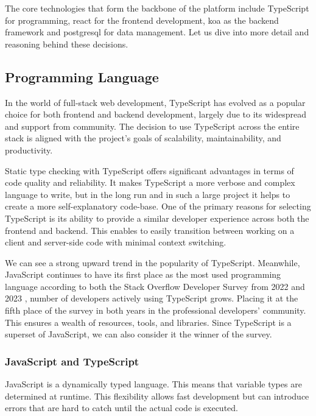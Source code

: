 The core technologies that form the backbone of the platform include TypeScript for programming, \gls{react} for the frontend development, \gls{koa} as the backend framework and \gls{postgresql} for data management.
Let us dive into more detail and reasoning behind these decisions.

\subsection{Programming Language}
\label{subsec:programming-language}
In the world of full-stack web development, TypeScript has evolved as a popular choice for both frontend and backend development, largely due to its widespread and support from community.
The decision to use TypeScript across the entire stack is aligned with the project's goals of scalability, maintainability, and productivity.

Static type checking with TypeScript offers significant advantages in terms of code quality and reliability.
It makes TypeScript a more verbose and complex language to write, but in the long run and in such a large project it helps to create a more self-explanatory code-base.
One of the primary reasons for selecting TypeScript is its ability to provide a similar developer experience across both the frontend and backend.
This enables to easily transition between working on a client and server-side code with minimal context switching.

We can see a strong upward trend in the popularity of TypeScript. Meanwhile, JavaScript continues to have its first place as the most used programming language according to both the Stack Overflow Developer Survey from 2022 \cite{StackOverflow2022} and 2023 \cite{StackOverflow2023}, number of developers actively using TypeScript grows. Placing it at the fifth place of the survey in both years in the professional developers' community.
This ensures a wealth of resources, tools, and libraries.
Since TypeScript is a superset of JavaScript, we can also consider it the winner of the survey.

\subsubsection{JavaScript and TypeScript}
JavaScript is a dynamically typed language.
This means that variable types are determined at runtime.
This flexibility allows fast development but can introduce errors that are hard to catch until the actual code is executed.

